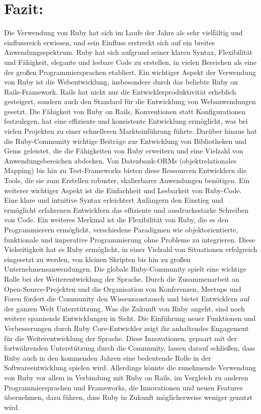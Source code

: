 \documentclass{article}
\begin{document}
\section*{Fazit:}
Die Verwendung von Ruby hat sich im Laufe der Jahre als sehr vielfältig und einflussreich erwiesen, und sein Einfluss erstreckt sich auf ein breites Anwendungsspektrum.
Ruby hat sich aufgrund seiner klaren Syntax, Flexibilität und Fähigkeit, elegante und lesbare Code zu erstellen, in vielen Bereichen als eine der großen Programmiersprachen etabliert.
Ein wichtiger Aspekt der Verwendung von Ruby ist die Webentwicklung, insbesondere durch das beliebte Ruby on Rails-Framework.
Rails hat nicht nur die Entwicklerproduktivität erheblich gesteigert, sondern auch den Standard für die Entwicklung von Webanwendungen gesetzt.
Die Fähigkeit von Ruby on Rails, Konventionen statt Konfigurationen festzulegen, hat eine effiziente und konsistente Entwicklung ermöglicht, was bei vielen Projekten zu einer schnelleren Markteinführung führte.
Darüber hinaus hat die Ruby-Community wichtige Beiträge zur Entwicklung von Bibliotheken und Gems geleistet, die die Fähigkeiten von Ruby erweitern und eine Vielzahl von Anwendungsbereichen abdecken.
Von Datenbank-ORMs (objektrelationales Mapping) bis hin zu Test-Frameworks bieten diese Ressourcen Entwicklern die Tools, die sie zum Erstellen robuster, skalierbarer Anwendungen benötigen.
Ein weiterer wichtiger Aspekt ist die Einfachheit und Lesbarkeit von Ruby-Code.
Eine klare und intuitive Syntax erleichtert Anfängern den Einstieg und ermöglicht erfahrenen Entwicklern das effiziente und ausdrucksstarke Schreiben von Code.
Ein weiteres Merkmal ist die Flexibilität von Ruby, die es den Programmierern ermöglicht, verschiedene Paradigmen wie objektorientierte, funktionale und imperative Programmierung ohne Probleme zu integrieren.
Diese Vielseitigkeit hat es Ruby ermöglicht, in einer Vielzahl von Situationen erfolgreich eingesetzt zu werden, von kleinen Skripten bis hin zu großen Unternehmensanwendungen.
Die globale Ruby-Community spielt eine wichtige Rolle bei der Weiterentwicklung der Sprache.
Durch die Zusammenarbeit an Open-Source-Projekten und die Organisation von Konferenzen, Meetups und Foren fördert die Community den Wissensaustausch und bietet Entwicklern auf der ganzen Welt Unterstützung.
Was die Zukunft von Ruby angeht, sind noch weitere spannende Entwicklungen in Sicht.
Die Einführung neuer Funktionen und Verbesserungen durch Ruby Core-Entwickler zeigt ihr anhaltendes Engagement für die Weiterentwicklung der Sprache.
Diese Innovationen, gepaart mit der fortwährenden Unterstützung durch die Community, lassen darauf schließen, dass Ruby auch in den kommenden Jahren eine bedeutende Rolle in der Softwareentwicklung spielen wird. Allerdings könnte die zunehmende Verwendung von Ruby vor allem in Verbindung mit Ruby on Rails, im Vergleich zu anderen Programmiersprachen und Frameworks, die Innovationen und neuen Features übernehmen, dazu führen, dass Ruby in Zukunft möglicherweise weniger genutzt wird.
\end{document}
